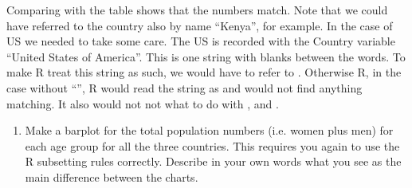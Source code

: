 \documentclass[letterpaper,10pt,english]{jupyterBook}
\begin{document}
Comparing with the table shows that the numbers match. Note that we could have referred to the country also by
name “Kenya”, for example. In the case of US we needed to take some care. The US is recorded with the Country variable “United States of America”. This is one string with blanks between the words. To make R treat this string as such, we would have to refer to . Otherwise R, in the case without “”, R would read the string as  and would not find anything matching. It also would not not what to do with ,  and .
\begin{enumerate}
%
\setcounter{enumi}{1}
\item {} 
\sphinxAtStartPar
Make a barplot for the total population numbers (i.e. women plus men) for
each age group for all the three countries. This requires you again to use the
R subsetting rules correctly. Describe in your own words what you see as the
main difference between the charts.

\end{enumerate}
\end{document}
